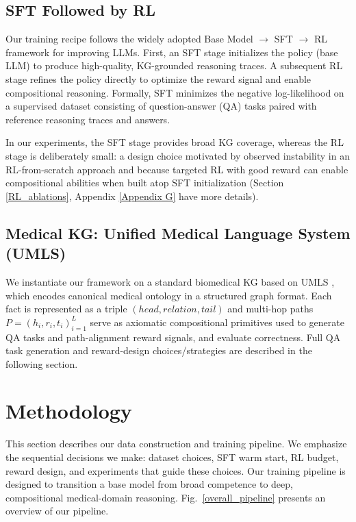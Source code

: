 \documentclass{article}
\theoremstyle{plain}
\theoremstyle{definition}
\theoremstyle{remark}
\begin{document}
\subsection{SFT Followed by RL} %
Our training recipe follows the widely adopted Base Model $\rightarrow$ SFT $\rightarrow$ RL framework for improving LLMs. First, an SFT stage initializes the policy (base LLM) to produce high-quality, KG-grounded reasoning traces. A subsequent RL stage refines the policy directly to optimize the reward signal and enable compositional reasoning. Formally, SFT minimizes the negative log-likelihood on a supervised dataset consisting of question-answer (QA) tasks paired with reference reasoning traces and answers.

In our experiments, the SFT stage provides broad KG coverage, whereas the RL stage is deliberately small: a design choice motivated by observed instability in an RL-from-scratch approach and because targeted RL with good reward can enable compositional abilities when built atop SFT initialization (Section \ref{RL_ablations}, Appendix \ref{Appendix G} have more details).

\subsection{Medical KG: Unified Medical Language System (UMLS)}
We instantiate our framework on a standard biomedical KG based on UMLS \cite{bodenreider2004unified}, which encodes canonical medical ontology in a structured graph format. Each fact is represented as a triple $(head, relation, tail)$ and multi-hop paths $P = {(h_i, r_i, t_i)}_{i=1}^L$ serve as axiomatic compositional primitives used to generate QA tasks and path-alignment reward signals, and evaluate correctness. Full QA task generation and reward-design choices/strategies are described in the following section.

\section{Methodology}
\label{Methodology}
This section describes our data construction and training pipeline. We emphasize the sequential decisions we make: dataset choices, SFT warm start, RL budget, reward design, and experiments that guide these choices. Our training pipeline is designed to transition a base model from broad competence to deep, compositional medical-domain reasoning. Fig.~\ref{overall_pipeline} presents an overview of our pipeline. %
\end{document}

